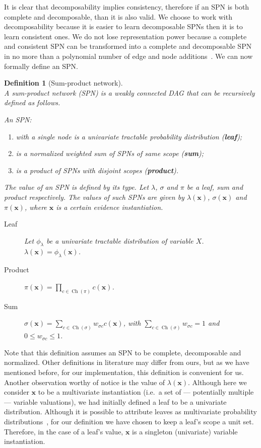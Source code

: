 \documentclass{amsart}
\DeclareMathOperator*{\Ch}{\text{Ch}}
\theoremstyle{plain}
\newcounter{dummy-def}\numberwithin{dummy-def}{section}
\newtheorem{definition}[dummy-def]{Definition}
\newcounter{dummy-thm}\numberwithin{dummy-thm}{section}
\newcounter{dummy-prop}\numberwithin{dummy-prop}{section}
\newcounter{dummy-corollary}\numberwithin{dummy-corollary}{section}
\newcounter{dummy-lemma}\numberwithin{dummy-lemma}{section}
\newcounter{dummy-ex}\numberwithin{dummy-ex}{section}
\newcounter{dummy-eg}\numberwithin{dummy-eg}{section}
\numberwithin{equation}{section}
\begin{document}
It is clear that decomposability implies consistency, therefore if an SPN is both complete and
decomposable, than it is also valid. We choose to work with decomposability because it is easier to
learn decomposable SPNs then it is to learn consistent ones. We do not lose representation power
because a complete and consistent SPN can be transformed into a complete and decomposable SPN in no
more than a polynomial number of edge and node additions~\cite{theoretical-spn}. We can now
formally define an SPN\@.

\begin{definition}[Sum-product network]\label{def:spn}~\\
  A sum-product network (SPN) is a weakly connected DAG that can be recursively defined as
  follows.

  An SPN\@:
  \begin{enumerate}
    \item with a single node is a univariate tractable probability distribution (\textbf{leaf});
    \item is a normalized weighted sum of SPNs of same scope (\textbf{sum});
    \item is a product of SPNs with disjoint scopes (\textbf{product}).
  \end{enumerate}
  The value of an SPN is defined by its type. Let $\lambda$, $\sigma$ and $\pi$ be a leaf, sum and
  product respectively. The values of such SPNs are given by $\lambda(\mathbf{x})$,
  $\sigma(\mathbf{x})$ and $\pi(\mathbf{x})$, where $\mathbf{x}$ is a certain evidence
  instantiation.
  \begin{description}
    \item[Leaf] Let $\phi_\lambda$ be a univariate tractable distribution of variable $X$.
      $\lambda(\mathbf{x})=\phi_\lambda(\mathbf{x})$.
    \item[Product] $\pi(\mathbf{x}) = \prod_{c \in \Ch(\pi)} c(\mathbf{x})$.
    \item[Sum] $\sigma(\mathbf{x}) = \sum_{c \in \Ch(\sigma)} w_{\sigma c} c(\mathbf{x})$, with
      $\sum_{c \in \Ch(\sigma)} w_{\sigma c} = 1$ and $0 \leq w_{\sigma c} \leq 1$.
  \end{description}
\end{definition}

Note that this definition assumes an SPN to be complete, decomposable and normalized. Other
definitions in literature may differ from ours, but as we have mentioned before, for our
implementation, this definition is convenient for us. Another observation worthy of notice is the
value of $\lambda(\mathbf{x})$. Although here we consider $\mathbf{x}$ to be a multivariate
instantiation (i.e.\ a set of --- potentially multiple --- variable valuations), we had initially
defined a leaf to be a univariate distribution. Although it is possible to attribute leaves as
multivariate probability distributions~\cite{id-spn}, for our definition we have chosen to keep a
leaf's scope a unit set. Therefore, in the case of a leaf's value, $\mathbf{x}$ is a singleton
(univariate) variable instantiation.
\end{document}
